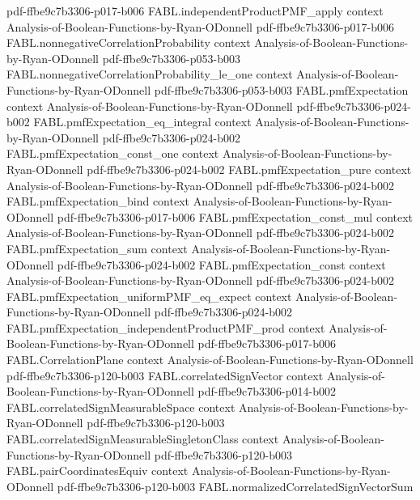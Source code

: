 \begin{theorem}
  {pdf-ffbe9c7b3306-p017-b006}
\proofstep
  {FABL.independentProductPMF_apply}
  {context}
  {Analysis-of-Boolean-Functions-by-Ryan-ODonnell}
  {pdf-ffbe9c7b3306-p017-b006}
\proofstep
  {FABL.nonnegativeCorrelationProbability}
  {context}
  {Analysis-of-Boolean-Functions-by-Ryan-ODonnell}
  {pdf-ffbe9c7b3306-p053-b003}
\proofstep
  {FABL.nonnegativeCorrelationProbability_le_one}
  {context}
  {Analysis-of-Boolean-Functions-by-Ryan-ODonnell}
  {pdf-ffbe9c7b3306-p053-b003}
\proofstep
  {FABL.pmfExpectation}
  {context}
  {Analysis-of-Boolean-Functions-by-Ryan-ODonnell}
  {pdf-ffbe9c7b3306-p024-b002}
\proofstep
  {FABL.pmfExpectation_eq_integral}
  {context}
  {Analysis-of-Boolean-Functions-by-Ryan-ODonnell}
  {pdf-ffbe9c7b3306-p024-b002}
\proofstep
  {FABL.pmfExpectation_const_one}
  {context}
  {Analysis-of-Boolean-Functions-by-Ryan-ODonnell}
  {pdf-ffbe9c7b3306-p024-b002}
\proofstep
  {FABL.pmfExpectation_pure}
  {context}
  {Analysis-of-Boolean-Functions-by-Ryan-ODonnell}
  {pdf-ffbe9c7b3306-p024-b002}
\proofstep
  {FABL.pmfExpectation_bind}
  {context}
  {Analysis-of-Boolean-Functions-by-Ryan-ODonnell}
  {pdf-ffbe9c7b3306-p017-b006}
\proofstep
  {FABL.pmfExpectation_const_mul}
  {context}
  {Analysis-of-Boolean-Functions-by-Ryan-ODonnell}
  {pdf-ffbe9c7b3306-p024-b002}
\proofstep
  {FABL.pmfExpectation_sum}
  {context}
  {Analysis-of-Boolean-Functions-by-Ryan-ODonnell}
  {pdf-ffbe9c7b3306-p024-b002}
\proofstep
  {FABL.pmfExpectation_const}
  {context}
  {Analysis-of-Boolean-Functions-by-Ryan-ODonnell}
  {pdf-ffbe9c7b3306-p024-b002}
\proofstep
  {FABL.pmfExpectation_uniformPMF_eq_expect}
  {context}
  {Analysis-of-Boolean-Functions-by-Ryan-ODonnell}
  {pdf-ffbe9c7b3306-p024-b002}
\proofstep
  {FABL.pmfExpectation_independentProductPMF_prod}
  {context}
  {Analysis-of-Boolean-Functions-by-Ryan-ODonnell}
  {pdf-ffbe9c7b3306-p017-b006}
\proofstep
  {FABL.CorrelationPlane}
  {context}
  {Analysis-of-Boolean-Functions-by-Ryan-ODonnell}
  {pdf-ffbe9c7b3306-p120-b003}
\proofstep
  {FABL.correlatedSignVector}
  {context}
  {Analysis-of-Boolean-Functions-by-Ryan-ODonnell}
  {pdf-ffbe9c7b3306-p014-b002}
\proofstep
  {FABL.correlatedSignMeasurableSpace}
  {context}
  {Analysis-of-Boolean-Functions-by-Ryan-ODonnell}
  {pdf-ffbe9c7b3306-p120-b003}
\proofstep
  {FABL.correlatedSignMeasurableSingletonClass}
  {context}
  {Analysis-of-Boolean-Functions-by-Ryan-ODonnell}
  {pdf-ffbe9c7b3306-p120-b003}
\proofstep
  {FABL.pairCoordinatesEquiv}
  {context}
  {Analysis-of-Boolean-Functions-by-Ryan-ODonnell}
  {pdf-ffbe9c7b3306-p120-b003}
\proofstep
  {FABL.normalizedCorrelatedSignVectorSum}

\end{theorem}
